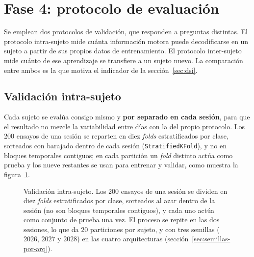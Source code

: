 \section{Fase 4: protocolo de evaluación}
\label{sec:fase4}

Se emplean dos protocolos de validación, que responden a preguntas distintas. El
protocolo intra-sujeto mide cuánta información motora puede decodificarse en un
sujeto a partir de sus propios datos de entrenamiento. El protocolo inter-sujeto
mide cuánto de ese aprendizaje se transfiere a un sujeto nuevo. La comparación
entre ambos es la que motiva el indicador de la sección~\ref{sec:dsi}.

\subsection{Validación intra-sujeto}
\label{sec:within}

Cada sujeto se evalúa consigo mismo y \textbf{por separado en cada sesión}, para
que el resultado no mezcle la variabilidad entre días con la del propio
protocolo. Los 200 ensayos de una sesión se reparten en diez \textit{folds} estratificados por
clase, sorteados con barajado dentro de cada sesión (\texttt{StratifiedKFold}), y no en
bloques temporales contiguos; en cada partición un \textit{fold} distinto actúa como prueba y los
nueve restantes se usan para entrenar y validar, como muestra la
figura~\ref{fig:within}.

\begin{figure}[H]
\centering
{}
\caption{Validación intra-sujeto. Los 200 ensayos de una sesión se dividen en
diez \textit{folds} estratificados por clase, sorteados al azar dentro de la sesión (no son
bloques temporales contiguos), y cada uno actúa como conjunto de prueba una vez. El proceso se
repite en las dos sesiones, lo que da 20 particiones por sujeto, y con tres semillas ($2026$, $2027$ y $2028$) en las
cuatro arquitecturas (sección~\ref{sec:semillas-por-arq}).}
\label{fig:within}
\end{figure}

